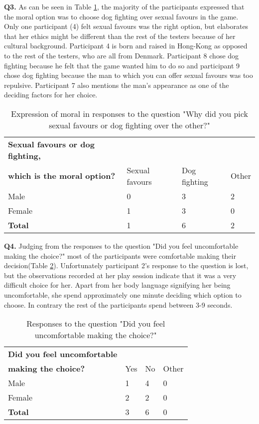 \textbf{Q3.}  As can be seen in Table \ref{tab:choice}, the majority of the participants expressed that the moral option was to choose dog fighting over sexual favours in the game. Only one participant (4) felt sexual favours was the right option, but elaborates that her ethics might be different than the rest of the testers because of her cultural background. Participant 4 is born and raised in Hong-Kong as opposed to the rest of the testers, who are all from Denmark. Participant 8 chose dog fighting because he felt that the game wanted him to do so and participant 9 chose dog fighting because the man to which you can offer sexual favours was too repulsive. Participant 7 also mentions the man's appearance as one of the deciding factors for her choice.

\begin{table}[h]
\centering
\begin{tabular}{l l l l}
\hline
\textbf{Sexual favours or dog fighting,}\\
\textbf{which is the moral option?} & Sexual favours & Dog fighting & Other \\
\hline
Male & 0 & 3 & 2 \\
Female & 1 & 3 & 0 \\
\textbf{Total} & 1 & 6 & 2 \\
\hline
\end{tabular}
\caption{\label{tab:choice}Expression of moral in responses to the question "Why did you pick sexual favours or dog fighting over the other?"}
\end{table}

\textbf{Q4.} Judging from the responses to the question "Did you feel uncomfortable making the choice?" most of the participants were comfortable making their decision(Table \ref{tab:unco}). Unfortunately participant 2's response to the question is lost, but the observations recorded at her play session indicate that it was a very difficult choice for her. Apart from her body language signifying her being uncomfortable, she spend approximately one minute deciding which option to choose. In contrary the rest of the participants spend between 3-9 seconds. 

\begin{table}[h]
\centering
\begin{tabular}{l l l l}
\hline
\textbf{Did you feel uncomfortable}\\
\textbf{making the choice?} & Yes & No & Other \\
\hline
Male & 1 & 4 & 0 \\
Female & 2 & 2 & 0 \\
\textbf{Total} & 3 & 6 & 0 \\
\hline
\end{tabular}
\caption{\label{tab:unco}Responses to the question "Did you feel uncomfortable making the choice?"}
\end{table}



